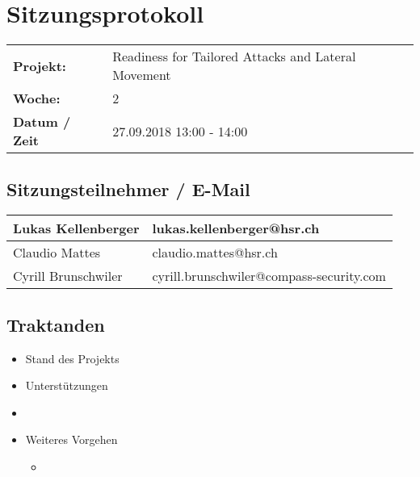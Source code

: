 \newcommand{\TITLE}{Readiness for Tailored Attacks and Lateral Movement Detection}
\newcommand{\REVIEW}{Wöchentliches Meeting}
\newcommand{\VERSION}{0.0}





\section*{Sitzungsprotokoll}

\begin{tabular}{p{4cm} p{12cm}}
    \textbf{Projekt:} & Readiness for Tailored Attacks and Lateral Movement  \\
    \textbf{Woche:} & 2 \\
    \textbf{Datum / Zeit} & 27.09.2018 13:00 - 14:00 \\
\end{tabular}

\subsection*{Sitzungsteilnehmer / E-Mail}
\begin{table}[H]
    \centering
    \begin{tabular}{p{4cm} p{12cm}} \hline
        Lukas Kellenberger & lukas.kellenberger@hsr.ch \\ \hline
        Claudio Mattes & claudio.mattes@hsr.ch \\ \hline
        Cyrill Brunschwiler & cyrill.brunschwiler@compass-security.com \\ \hline
    \end{tabular}
\end{table}

\vspace{1cm}

\subsection*{Traktanden}
\begin{itemize}
    \item Stand des Projekts
    \item Unterstützungen
    \item <Aufzählung von aktuellen Traktanden oder wichtigen Punkten>
    \item Weiteres Vorgehen
    \begin{itemize}
        \item <Aufzählung von weiterem Vorgehen>
    \end{itemize}
\end{itemize}

